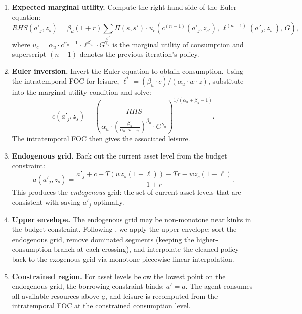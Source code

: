 \documentclass[12pt]{article}
\begin{document}
\begin{enumerate}[label=\textit{Step \arabic*.}]
  \item \textbf{Expected marginal utility.} Compute the right-hand side of the Euler equation:
  \begin{equation}\label{eq:egm_rhs}
    RHS(a'_j, z_s) = \beta_d (1+r) \sum_{s'} \Pi(s, s') \cdot u_c\!\left(c^{(n-1)}(a'_j, z_{s'}),\, \ell^{(n-1)}(a'_j, z_{s'}),\, G\right),
  \end{equation}
  where $u_c = \alpha_u \cdot c^{\alpha_u - 1} \cdot \ell^{\beta_u} \cdot G^{\gamma_u}$ is the marginal utility of consumption and superscript $(n-1)$ denotes the previous iteration's policy.

  \item \textbf{Euler inversion.} Invert the Euler equation to obtain consumption. Using the intratemporal FOC for leisure, $\ell^* = (\beta_u \cdot c) / (\alpha_u \cdot w \cdot z)$, substitute into the marginal utility condition and solve:
  \begin{equation}\label{eq:egm_inversion}
    c(a'_j, z_s) = \left(\frac{RHS}{\alpha_u \cdot \left(\frac{\beta_u}{\alpha_u \cdot w \cdot z_s}\right)^{\beta_u} \cdot G^{\gamma_u}}\right)^{1/(\alpha_u + \beta_u - 1)}.
  \end{equation}
  The intratemporal FOC then gives the associated leisure.

  \item \textbf{Endogenous grid.} Back out the current asset level from the budget constraint:
  \begin{equation}\label{eq:egm_endo}
    a(a'_j, z_s) = \frac{a'_j + c + T(wz_s(1-\ell)) - Tr - wz_s(1-\ell)}{1 + r}.
  \end{equation}
  This produces the \emph{endogenous} grid: the set of current asset levels that are consistent with saving $a'_j$ optimally.

  \item \textbf{Upper envelope.} The endogenous grid may be non-monotone near kinks in the budget constraint. Following \citet{fella2014}, we apply the upper envelope: sort the endogenous grid, remove dominated segments (keeping the higher-consumption branch at each crossing), and interpolate the cleaned policy back to the exogenous grid via monotone piecewise linear interpolation.

  \item \textbf{Constrained region.} For asset levels below the lowest point on the endogenous grid, the borrowing constraint binds: $a' = \underline{a}$. The agent consumes all available resources above $\underline{a}$, and leisure is recomputed from the intratemporal FOC at the constrained consumption level.
\end{enumerate}
\end{document}
